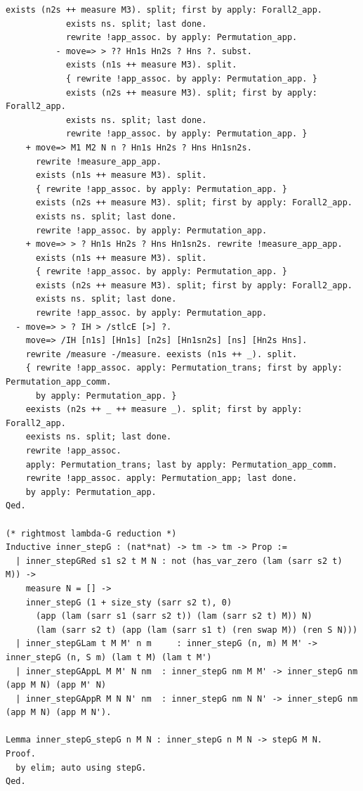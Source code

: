 \documentclass[10pt,a4paper]{article}
\begin{document}
\begin{lstlisting}[style=authorcoq]
            exists (n2s ++ measure M3). split; first by apply: Forall2_app.
            exists ns. split; last done.
            rewrite !app_assoc. by apply: Permutation_app.
          - move=> > ?? Hn1s Hn2s ? Hns ?. subst.
            exists (n1s ++ measure M3). split.
            { rewrite !app_assoc. by apply: Permutation_app. }
            exists (n2s ++ measure M3). split; first by apply: Forall2_app.
            exists ns. split; last done.
            rewrite !app_assoc. by apply: Permutation_app. }
    + move=> M1 M2 N n ? Hn1s Hn2s ? Hns Hn1sn2s.
      rewrite !measure_app_app.
      exists (n1s ++ measure M3). split.
      { rewrite !app_assoc. by apply: Permutation_app. }
      exists (n2s ++ measure M3). split; first by apply: Forall2_app.
      exists ns. split; last done.
      rewrite !app_assoc. by apply: Permutation_app.
    + move=> > ? Hn1s Hn2s ? Hns Hn1sn2s. rewrite !measure_app_app.
      exists (n1s ++ measure M3). split.
      { rewrite !app_assoc. by apply: Permutation_app. }
      exists (n2s ++ measure M3). split; first by apply: Forall2_app.
      exists ns. split; last done.
      rewrite !app_assoc. by apply: Permutation_app.
  - move=> > ? IH > /stlcE [>] ?.
    move=> /IH [n1s] [Hn1s] [n2s] [Hn1sn2s] [ns] [Hn2s Hns].
    rewrite /measure -/measure. eexists (n1s ++ _). split.
    { rewrite !app_assoc. apply: Permutation_trans; first by apply: Permutation_app_comm.
      by apply: Permutation_app. }
    eexists (n2s ++ _ ++ measure _). split; first by apply: Forall2_app.
    eexists ns. split; last done.
    rewrite !app_assoc.
    apply: Permutation_trans; last by apply: Permutation_app_comm.
    rewrite !app_assoc. apply: Permutation_app; last done.
    by apply: Permutation_app.
Qed.

(* rightmost lambda-G reduction *)
Inductive inner_stepG : (nat*nat) -> tm -> tm -> Prop :=
  | inner_stepGRed s1 s2 t M N : not (has_var_zero (lam (sarr s2 t) M)) ->
    measure N = [] ->
    inner_stepG (1 + size_sty (sarr s2 t), 0)
      (app (lam (sarr s1 (sarr s2 t)) (lam (sarr s2 t) M)) N)
      (lam (sarr s2 t) (app (lam (sarr s1 t) (ren swap M)) (ren S N)))
  | inner_stepGLam t M M' n m     : inner_stepG (n, m) M M' -> inner_stepG (n, S m) (lam t M) (lam t M')
  | inner_stepGAppL M M' N nm  : inner_stepG nm M M' -> inner_stepG nm (app M N) (app M' N)
  | inner_stepGAppR M N N' nm  : inner_stepG nm N N' -> inner_stepG nm (app M N) (app M N').

Lemma inner_stepG_stepG n M N : inner_stepG n M N -> stepG M N.
Proof.
  by elim; auto using stepG.
Qed.


\end{lstlisting}
\end{document}
